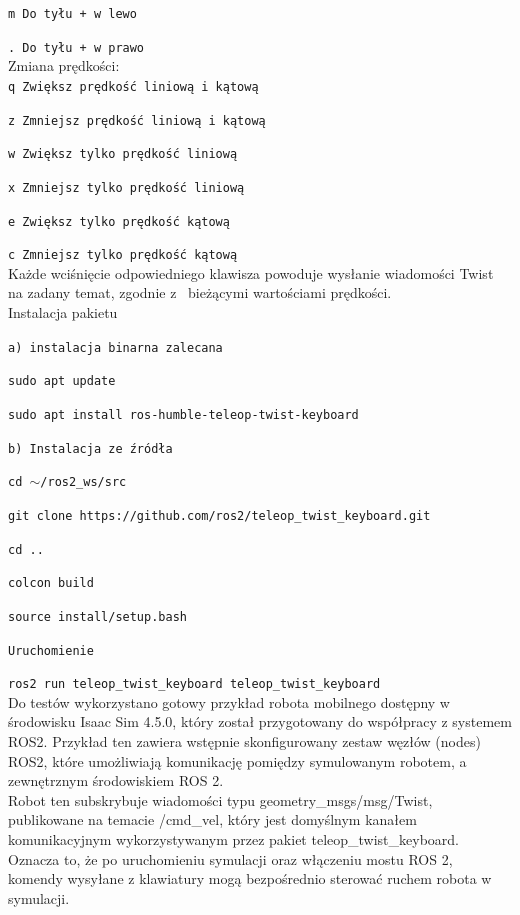 \documentclass[12pt]{article}
\begin{document}
\texttt{m  Do tyłu + w lewo}

\texttt{.  Do tyłu + w prawo}\\
 
\noindent Zmiana prędkości:\\

\texttt{q  Zwiększ prędkość liniową i kątową}

\texttt{z  Zmniejsz prędkość liniową i kątową}

\texttt{w  Zwiększ tylko prędkość liniową}

\texttt{x  Zmniejsz tylko prędkość liniową}

\texttt{e  Zwiększ tylko prędkość kątową}

\texttt{c  Zmniejsz tylko prędkość kątową}\\

\noindent Każde wciśnięcie odpowiedniego klawisza powoduje wysłanie wiadomości Twist na zadany temat, zgodnie z~ bieżącymi wartościami prędkości.\\

\noindent Instalacja pakietu

\texttt{a) instalacja binarna zalecana}

\texttt{sudo apt update}

\texttt{sudo apt install ros-humble-teleop-twist-keyboard}

\texttt{b) Instalacja ze źródła}

\texttt{cd $\sim$/ros2\_ws/src}

\texttt{git clone https://github.com/ros2/teleop\_twist\_keyboard.git}

\texttt{cd ..}

\texttt{colcon build}

\texttt{source install/setup.bash}

\texttt{Uruchomienie}

\texttt{ros2 run teleop\_twist\_keyboard teleop\_twist\_keyboard}\\

\noindent Do testów wykorzystano gotowy przykład robota mobilnego dostępny w środowisku Isaac Sim 4.5.0, który został przygotowany do współpracy z systemem ROS2. Przykład ten zawiera wstępnie skonfigurowany zestaw węzłów (nodes) ROS2, które umożliwiają komunikację pomiędzy symulowanym robotem, a zewnętrznym środowiskiem ROS 2. \\

\noindent Robot ten subskrybuje wiadomości typu geometry\_msgs/msg/Twist, publikowane na temacie /cmd\_vel, który jest domyślnym kanałem komunikacyjnym wykorzystywanym przez pakiet teleop\_twist\_keyboard. Oznacza to, że po uruchomieniu symulacji oraz włączeniu mostu ROS 2, komendy wysyłane z klawiatury mogą bezpośrednio sterować ruchem robota w symulacji.
\end{document}
